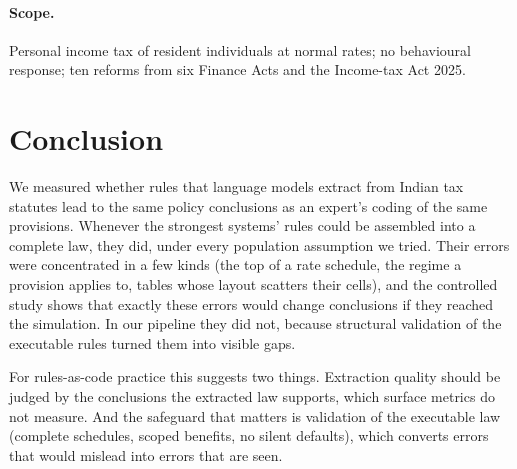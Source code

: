 \documentclass[sn-apa]{sn-jnl}
\begin{document}
\paragraph{Scope.} Personal income tax of resident individuals at normal
rates; no behavioural response; ten reforms from six Finance Acts and the
Income-tax Act 2025.

\section{Conclusion}\label{sec:conclusion}

We measured whether rules that language models extract from Indian tax
statutes lead to the same policy conclusions as an expert's coding of the
same provisions. Whenever the strongest systems' rules could be assembled
into a complete law, they did, under every population assumption we tried.
Their errors were concentrated in a few kinds (the top of a rate schedule,
the regime a provision applies to, tables whose layout scatters their
cells), and the controlled study shows that exactly these errors would
change conclusions if they reached the simulation. In our pipeline they did
not, because structural validation of the executable rules turned them into
visible gaps.

For rules-as-code practice this suggests two things. Extraction quality
should be judged by the conclusions the extracted law supports, which surface
metrics do not measure. And the safeguard that matters is validation of the
executable law (complete schedules, scoped benefits, no silent defaults),
which converts errors that would mislead into errors that are seen.
\end{document}
